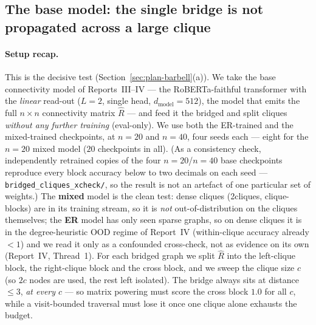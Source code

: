 \documentclass[11pt,a4paper]{article}
\begin{document}
\subsection{The base model: the single bridge is not propagated across a large clique}
\label{sec:res-base}

\paragraph{Setup recap.} This is the decisive test (Section~\ref{sec:plan-barbell}(a)). We take
the base connectivity model of Reports~III--IV --- the RoBERTa-faithful transformer with the
\emph{linear} read-out ($L=2$, single head, $d_{\mathrm{model}}=512$), the model that emits the
full $n\times n$ connectivity matrix $\hat R$ --- and feed it the bridged and split cliques
\emph{without any further training} (eval-only). We use both the ER-trained and the mixed-trained
checkpoints, at $n=20$ and $n=40$, four seeds each --- eight for the $n=20$ mixed model
($20$ checkpoints in all). (As a consistency check, independently retrained copies of the four
$n=20$/$n=40$ base checkpoints reproduce every block accuracy below to two decimals on each seed
--- \texttt{bridged\_cliques\_xcheck/}, so the result is not an artefact of one particular set of
weights.) The \textbf{mixed} model is
the clean test: dense cliques (2cliques, clique-blocks) are in its training stream, so it is
\emph{not} out-of-distribution on the cliques themselves; the \textbf{ER} model has only seen
sparse graphs, so on dense cliques it is in the degree-heuristic OOD regime of Report~IV
(within-clique accuracy already $<1$) and we read it only as a confounded cross-check, not as
evidence on its own (Report~IV, Thread~1). For each bridged graph we split $\hat R$ into the
left-clique block, the right-clique block and the cross block, and we sweep the clique size
$c$ (so $2c$ nodes are used, the rest left isolated). The bridge always sits at distance $\le 3$,
\emph{at every $c$} --- so matrix powering must score the cross block $1.0$ for all $c$, while a
visit-bounded traversal must lose it once one clique alone exhausts the budget.
\end{document}
